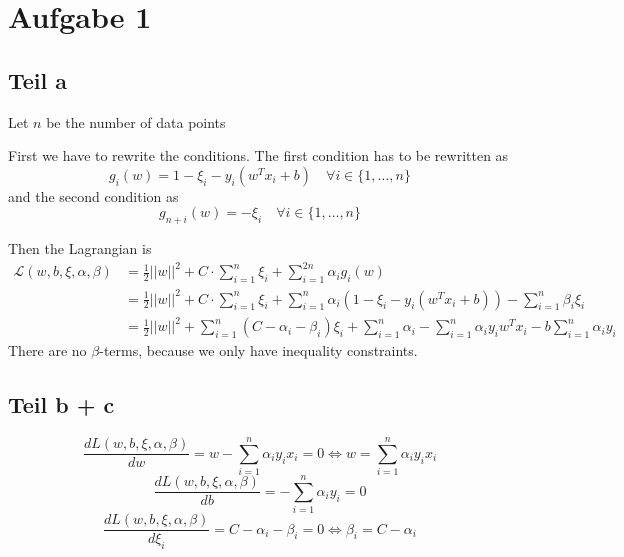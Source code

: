 \documentclass[10pt,a4paper]{article}
\begin{document}
\section{Aufgabe 1}

\subsection{Teil a}

Let $n$ be the number of data points

First we have to rewrite the conditions. The first condition has to be rewritten
as
\begin{equation}
  g_{i}(w) = 1 - \xi_{i} - y_{i}(w^{T}x_{i} + b) \quad \forall i \in \{ 1, \dots, n \}
\end{equation}
and the second condition as
\begin{equation}
  g_{n + i}(w) = -\xi_{i} \quad \forall i \in \{ 1, \dots, n \}
\end{equation}

Then the Lagrangian is
\begin{align*}
  \mathcal{L}(w, b, \xi, \alpha, \beta) & = \frac{1}{2} ||w||^{2} + C \cdot \sum_{i = 1}^{n} \xi_{i} + \sum_{i = 1}^{2n} \alpha_{i}g_{i}(w)\\
                                        & = \frac{1}{2} ||w||^{2} + C \cdot \sum_{i = 1}^{n} \xi_{i} + \sum_{i = 1}^{n} \alpha_{i} (1 - \xi_{i} - y_{i}(w^{T}x_{i} + b)) - \sum_{i = 1}^{n} \beta_{i} \xi_{i}\\
                                        & = \frac{1}{2} ||w||^{2} + \sum_{i = 1}^{n} (C - \alpha_{i} - \beta_{i}) \xi_{i} + \sum_{i = 1}^{n} \alpha_{i} - \sum_{i = 1}^{n} \alpha_{i} y_{i}w^{T}x_{i} - b \sum_{i = 1}^{n} \alpha_{i}y_{i}
\end{align*}
There are no $\beta$-terms, because we only have inequality constraints.

\subsection{Teil b + c}

\begin{equation}
  \frac{d L(w, b, \xi, \alpha, \beta)}{dw} = w - \sum_{i = 1}^{n} \alpha_{i}y_{i}x_{i} = 0 \Leftrightarrow w = \sum_{i = 1}^{n} \alpha_{i}y_{i}x_{i}
\end{equation}
\begin{equation}
  \frac{d L(w, b, \xi, \alpha, \beta)}{db} = -\sum_{i = 1}^{n} \alpha_{i}y_{i} = 0
\end{equation}
\begin{equation}
  \frac{d L(w, b, \xi, \alpha, \beta)}{d \xi_{i}} = C - \alpha_{i} - \beta_{i} = 0 \Leftrightarrow \beta_{i} = C - \alpha_{i}
\end{equation}
\end{document}
